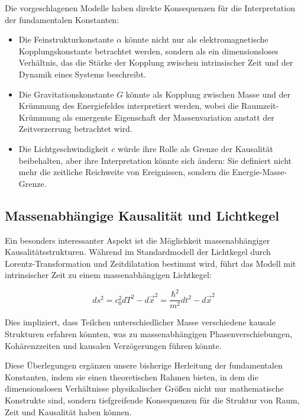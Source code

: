 \documentclass{article}
\begin{document}
	Die vorgeschlagenen Modelle haben direkte Konsequenzen für die Interpretation der fundamentalen Konstanten:
	
	\begin{itemize}
		\item Die Feinstrukturkonstante $\alpha$ könnte nicht nur als elektromagnetische Kopplungskonstante betrachtet werden, sondern als ein dimensionsloses Verhältnis, das die Stärke der Kopplung zwischen intrinsischer Zeit und der Dynamik eines Systems beschreibt.
		
		\item Die Gravitationskonstante $G$ könnte als Kopplung zwischen Masse und der Krümmung des Energiefeldes interpretiert werden, wobei die Raumzeit-Krümmung als emergente Eigenschaft der Massenvariation anstatt der Zeitverzerrung betrachtet wird.
		
		\item Die Lichtgeschwindigkeit $c$ würde ihre Rolle als Grenze der Kausalität beibehalten, aber ihre Interpretation könnte sich ändern: Sie definiert nicht mehr die zeitliche Reichweite von Ereignissen, sondern die Energie-Masse-Grenze.
	\end{itemize}
	
	\subsection{Massenabhängige Kausalität und Lichtkegel}
	
	Ein besonders interessanter Aspekt ist die Möglichkeit massenabhängiger Kausalitätsstrukturen. Während im Standardmodell der Lichtkegel durch Lorentz-Transformation und Zeitdilatation bestimmt wird, führt das Modell mit intrinsischer Zeit zu einem massenabhängigen Lichtkegel:
	
	\begin{equation}
		ds^2 = c_0^2 dT^2 - d\vec{x}^2 = \frac{\hbar^2}{m^2} dt^2 - d\vec{x}^2
	\end{equation}
	
	Dies impliziert, dass Teilchen unterschiedlicher Masse verschiedene kausale Strukturen erfahren könnten, was zu massenabhängigen Phasenverschiebungen, Kohärenzzeiten und kausalen Verzögerungen führen könnte.
	
	Diese Überlegungen ergänzen unsere bisherige Herleitung der fundamentalen Konstanten, indem sie einen theoretischen Rahmen bieten, in dem die dimensionslosen Verhältnisse physikalischer Größen nicht nur mathematische Konstrukte sind, sondern tiefgreifende Konsequenzen für die Struktur von Raum, Zeit und Kausalität haben können.
	
\end{document}
